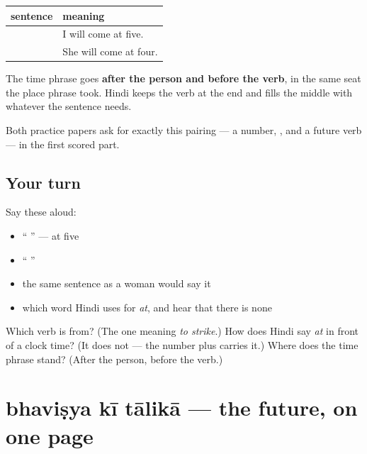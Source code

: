 \begin{grammarlens}[title={Grammar Lens: where it stands in the sentence}]
\noindent
\begin{tabularx}{\linewidth}{@{}>{\raggedright\arraybackslash}X>{\raggedright\arraybackslash}X@{}}
\toprule
\textbf{sentence} & \textbf{meaning} \\
\midrule
\hi{मैं} \hi{पाँच} \hi{बजे} \hi{आऊँगा।} & I will come at five. \\
\hi{वह} \hi{चार} \hi{बजे} \hi{आएगी।} & She will come at four. \\
\bottomrule
\end{tabularx}

The time phrase goes \textbf{after the person and before the verb}, in the same seat the place phrase took. Hindi keeps the verb at the end and fills the middle with whatever the sentence needs.

Both practice papers ask for exactly this pairing — a number, \textbf{}, and a future verb — in the first scored part.
\end{grammarlens}

\subsection*{Your turn}
Say these aloud:

\begin{itemize}
\raggedright
  \item \textquotedblleft{} \textquotedblright{} — at five
  \item \textquotedblleft{}   \textquotedblright{}
  \item the same sentence as a woman would say it
  \item which word Hindi uses for \emph{at}, and hear that there is none
\end{itemize}

\begin{tcolorbox}[breakable,colback=teal!4,colframe=teal!35!black,title={Before you move on}]
Which verb is \textbf{} from? (The one meaning \emph{to strike}.) How does Hindi say \emph{at} in front of a clock time? (It does not — the number plus \textbf{} carries it.) Where does the time phrase stand? (After the person, before the verb.)
\end{tcolorbox}
\section[\texorpdfstring{\hi{भविष्य} \hi{की} \hi{तालिका} (bhaviṣya kī tālikā)}{भविष्य की तालिका (bhaviṣya kī tālikā)}]{bhaviṣya kī tālikā — the future, on one page}

